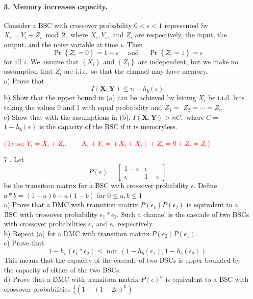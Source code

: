 \documentclass[8pt]{article}
\begin{document}
\begin{tcolorbox}
\paragraph{3. Memory increases capacity.} Consider a BSC with crossover probability $0<\epsilon<1$ represented by $X_{i}=Y_{i}+Z_{i} \bmod 2,$
where $X_{i}, Y_{i},$ and $Z_{i}$ are respectively, the input, the output, and the noise variable at time $i .$ Then
$$
\operatorname{Pr}\left\{Z_{i}=0\right\}=1-\epsilon \quad \text { and } \quad \operatorname{Pr}\left\{Z_{i}=1\right\}=\epsilon
$$
for all $i .$ We assume that $\left\{X_{i}\right\}$ and $\left\{Z_{i}\right\}$ are independent, but we make no assumption that $Z_{i}$ are i.i.d. so that the channel may have memory. \\
a) Prove that
$$
I(\mathbf{X} ; \mathbf{Y}) \leq n-h_{b}(\epsilon)
$$
b) Show that the upper bound in (a) can be achieved by letting $X_{i}$ be
i.i.d. bits taking the values 0 and 1 with equal probability and $Z_{1}=$ $Z_{2}=\cdots=Z_{n}$ \\
c) Show that with the assumptions in (b), $I(\mathbf{X} ; \mathbf{Y})>n C,$ where $C=$ $1-h_{b}(\epsilon)$ is the capacity of the $\mathrm{BSC}$ if it is memoryless.

\textcolor{red}{(Typo: $Y_i = X_i + Z_i, \qquad X_i+Y_i =( X_i + X_i) + Z_i = 0  + Z_i = Z_i$)}
\end{tcolorbox}


\begin{tcolorbox}
7 . Let
$$
P(\epsilon)=\left[\begin{array}{cc}
	1-\epsilon & \epsilon \\
	\epsilon & 1-\epsilon
\end{array}\right]
$$
be the transition matrix for a BSC with crossover probability $\epsilon .$ Define $a * b=(1-a) b+a(1-b)$ for $0 \leq a, b \leq 1$\\
a) Prove that a DMC with transition matrix $P\left(\epsilon_{1}\right) P\left(\epsilon_{2}\right)$ is equivalent to a BSC with crossover probability $\epsilon_{1} * \epsilon_{2} .$ Such a channel is the cascade of two BSCs with crossover probabilities $\epsilon_{1}$ and $\epsilon_{2}$ respectively.\\
b) Repeat (a) for a DMC with transition matrix $P\left(\epsilon_{2}\right) P\left(\epsilon_{1}\right)$.\\
c) Prove that
$$
1-h_{b}\left(\epsilon_{1} * \epsilon_{2}\right) \leq \min \left(1-h_{b}\left(\epsilon_{1}\right), 1-h_{b}\left(\epsilon_{2}\right)\right)
$$
This means that the capacity of the cascade of two BSCs is upper bounded by the capacity of either of the two BSCs.\\
d) Prove that a DMC with transition matrix $P(\epsilon)^{n}$ is equivalent to a BSC with crossover probabilities $\frac{1}{2}\left(1-(1-2 \epsilon)^{n}\right)$
\end{tcolorbox}
\end{document}
